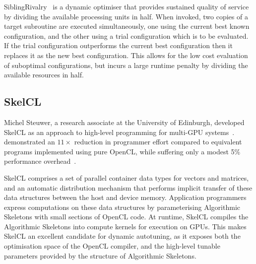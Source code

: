 SiblingRivalry~\cite{Ansel2012} is a dynamic optimiser that provides
sustained quality of service by dividing the available processing
units in half. When invoked, two copies of a target subroutine are
executed simultaneously, one using the current best known
configuration, and the other using a trial configuration which is to
be evaluated. If the trial configuration outperforms the current best
configuration then it replaces it as the new best configuration. This
allows for the low cost evaluation of suboptimal configurations, but
incurs a large runtime penalty by dividing the available resources in
half.

\subsection{SkelCL}
Michel Steuwer, a research associate at the University of Edinburgh,
developed SkelCL as an approach to high-level programming for
multi-GPU systems~\cite{Steuwer2011,
  Steuwer2013a}. \citeauthor{Steuwer2012} demonstrated an $11\times$
reduction in programmer effort compared to equivalent programs
implemented using pure OpenCL, while suffering only a modest 5\%
performance overhead~\cite{Steuwer2012}.

SkelCL comprises a set of parallel container data types for vectors
and matrices, and an automatic distribution mechanism that performs
implicit transfer of these data structures between the host and device
memory. Application programmers express computations on these data
structures by parameterising Algorithmic Skeletons with small sections
of OpenCL code. At runtime, SkelCL compiles the Algorithmic Skeletons
into compute kernels for execution on GPUs. This makes SkelCL an
excellent candidate for dynamic autotuning, as it exposes both the
optimisation space of the OpenCL compiler, and the high-level tunable
parameters provided by the structure of Algorithmic Skeletons.
